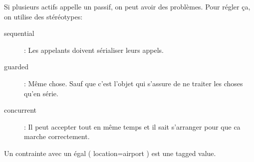 Si plusieurs actifs appelle un passif, on peut avoir des problèmes. Pour régler ça, on utilise des stéréotypes:
\begin{description}
	\item [sequential]: Les appelants doivent sérialiser leurs appels.
	\item [guarded]: Même chose. Sauf que c’est l’objet qui s’assure de ne traiter les choses qu’en série.
	\item [concurrent]: Il peut accepter tout en même temps et il sait s’arranger pour que ca marche correctement.
\end{description}

Un contrainte avec un égal ( {location=airport} ) est une tagged value.